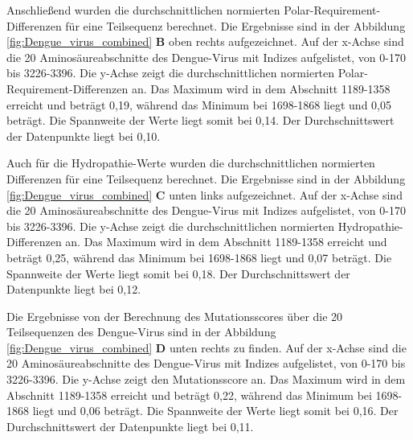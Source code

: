 \documentclass[german,version-2022-01]{uzl-thesis}
\begin{document}
Anschlie\ss{}end wurden die durchschnittlichen normierten Polar-Requirement-Differenzen f\"ur eine Teilsequenz berechnet. Die Ergebnisse sind in der Abbildung \ref{fig:Dengue_virus_combined} \textbf{B} oben rechts aufgezeichnet. Auf der x-Achse sind die 20 Aminos\"aureabschnitte des Dengue-Virus mit Indizes aufgelistet, von 0-170 bis 3226-3396. Die y-Achse zeigt die durchschnittlichen normierten Polar-Requirement-Differenzen an. Das Maximum wird in dem Abschnitt 1189-1358 erreicht und betr\"agt 0,19, w\"ahrend das Minimum bei 1698-1868 liegt und 0,05 betr\"agt. Die Spannweite der Werte liegt somit bei 0,14. Der Durchschnittswert der Datenpunkte liegt bei 0,10. 

Auch f\"ur die Hydropathie-Werte wurden die durchschnittlichen normierten Differenzen f\"ur eine Teilsequenz berechnet. Die Ergebnisse sind in der Abbildung \ref{fig:Dengue_virus_combined} \textbf{C} unten links aufgezeichnet. Auf der x-Achse sind die 20 Aminos\"aureabschnitte des Dengue-Virus mit Indizes aufgelistet, von 0-170 bis 3226-3396. Die y-Achse zeigt die durchschnittlichen normierten Hydropathie-Differenzen an. Das Maximum wird in dem Abschnitt 1189-1358 erreicht und betr\"agt 0,25, w\"ahrend das Minimum bei 1698-1868 liegt und 0,07 betr\"agt. Die Spannweite der Werte liegt somit bei 0,18. Der Durchschnittswert der Datenpunkte liegt bei 0,12.

Die Ergebnisse von der Berechnung des Mutationsscores \"uber die 20 Teilsequenzen des Dengue-Virus sind in der Abbildung \ref{fig:Dengue_virus_combined} \textbf{D} unten rechts zu finden. Auf der x-Achse sind die 20 Aminos\"aureabschnitte des Dengue-Virus mit Indizes aufgelistet, von 0-170 bis 3226-3396. Die y-Achse zeigt den Mutationsscore an. Das Maximum wird in dem Abschnitt 1189-1358 erreicht und betr\"agt 0,22, w\"ahrend das Minimum bei 1698-1868 liegt und 0,06 betr\"agt. Die Spannweite der Werte liegt somit bei 0,16. Der Durchschnittswert der Datenpunkte liegt bei 0,11. 
\end{document}
